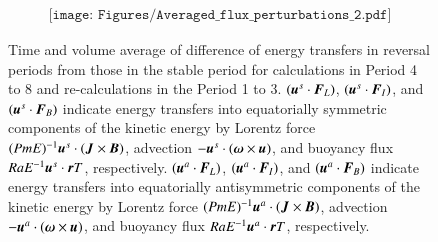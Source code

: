 \begin{figure}[ht]
\begin{center}
\[
\begin{array}{c}
\texttt{[image: Figures/Averaged\_flux\_perturbations\_2.pdf]}
\end{array}
\]
\end{center}
\caption{
 Time and volume average of difference of energy transfers in reversal periods from those in the stable period for calculations in Period 4 to 8 and re-calculations in the Period 1 to 3.
{\color{blue}
$(\mbox{\boldmath$u$}^s \cdot \mbox{\boldmath$F$}_{L})$, $(\mbox{\boldmath$u$}^s \cdot \mbox{\boldmath$F$}_{I})$, and $(\mbox{\boldmath$u$}^s \cdot \mbox{\boldmath$F$}_{B})$ indicate energy transfers into equatorially symmetric components of the kinetic energy by Lorentz force $(Pm E)^{-1} \mbox{\boldmath$u$}^s \cdot (\mbox{\boldmath$J$} \times \mbox{\boldmath$B$})$, advection $-\mbox{\boldmath$u$}^s \cdot(\mbox{\boldmath$\omega$} \times \mbox{\boldmath$u$})$, and buoyancy flux $Ra E^{-1} \mbox{\boldmath$u$}^s \cdot \mbox{\boldmath$r$} T$, respectively. 
$(\mbox{\boldmath$u$}^a \cdot \mbox{\boldmath$F$}_{L})$, $(\mbox{\boldmath$u$}^a \cdot \mbox{\boldmath$F$}_{I})$, and $(\mbox{\boldmath$u$}^a \cdot \mbox{\boldmath$F$}_{B})$ indicate energy transfers into equatorially antisymmetric components of the kinetic energy by Lorentz force $(Pm E)^{-1} \mbox{\boldmath$u$}^a \cdot (\mbox{\boldmath$J$} \times \mbox{\boldmath$B$})$, advection $-\mbox{\boldmath$u$}^a \cdot(\mbox{\boldmath$\omega$} \times \mbox{\boldmath$u$})$, and buoyancy flux $Ra E^{-1} \mbox{\boldmath$u$}^a \cdot \mbox{\boldmath$r$} T$, respectively. 
}
}
\label{Fig:Change_flux_summary_6grp}
\end{figure}